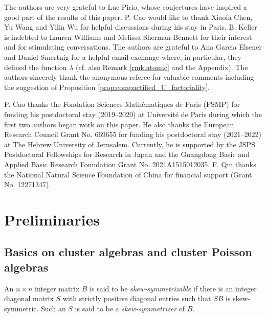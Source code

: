 \documentclass{amsart}
\theoremstyle{definition}
\theoremstyle{remark}
\numberwithin{equation}{section}
\begin{document}
The authors are very grateful to Luc Pirio, whose conjectures have inspired a good part of the results of this paper. P. Cao would like to thank Xiaofa Chen, Yu Wang and Yilin Wu for helpful discussions during his stay in Paris. B. Keller is indebted
to Lauren Williams and Melissa Sherman-Bennett for their interest and for stimulating conversations. The authors are grateful to Ana Garcia Elsener and Daniel Smertnig for a helpful email exchange \cite{GS_2022} where, in particular, they defined the function $\lambda$ (cf. also Remark \ref{rmk:atomic} and the Appendix). The authors sincerely thank the anonymous referee for valuable comments including the suggestion of Proposition \ref{prop:compactified_U_factoriality}.
 

P. Cao thanks the Fondation Sciences Math\'ematiques de Paris (FSMP) for funding his postdoctoral
stay (2019--2020) at Universit\'e de Paris during which the first two authors began work on this paper. He also thanks the European Research Council Grant No. 669655 for funding his postdoctoral stay (2021--2022) at The Hebrew University of Jerusalem. Currently, he is supported by the JSPS Postdoctoral Fellowships for Research in Japan and  the Guangdong Basic and Applied Basic Research
Foundation Grant No. 2021A1515012035. F. Qin thanks the National Natural Science Foundation of China for financial support (Grant No. 12271347).




\section{Preliminaries}\label{sec2}

\subsection{Basics on cluster algebras and cluster Poisson algebras}

An $n\times n$ integer matrix $B$ is said to be {\em  skew-symmetrizable} if there is an integer diagonal matrix $S$ with strictly positive diagonal entries such that $SB$ is skew-symmetric. Such an $S$ is said to be a {\em  skew-symmetrizer} of $B$.
\end{document}
